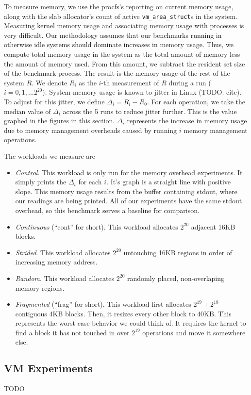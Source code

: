 \documentclass[twocolumn,11pt]{article}
\begin{document}
To measure memory, we use the procfs's reporting on current memory usage, along
with the slab allocator's count of active \texttt{vm\_area\_struct}s in the
system. Measuring kernel memory usage and associating memory usage with
processes is very difficult. Our methodology assumes that our benchmarks running
in otherwise idle systems should dominate increases in memory usage.  Thus, we
compute total memory usage in the system as the total amount of memory less the
amount of memory used. From this amount, we subtract the resident set size of
the benchmark process. The result is the memory usage of the rest of the system
$R$. We denote $R_i$ as the $i$-th measurement of $R$ during a run ($i = 0, 1,
... 2^{20}$). System memory usage is known to jitter in Linux (TODO: cite). To
adjust for this jitter, we define $\Delta_i = R_i - R_0$. For each operation, we
take the median value of $\Delta_i$ across the 5 runs to reduce jitter further.
This is the value graphed in the figures in this section. $\Delta_i$ represents
the increase in memory usage due to memory management overheads caused by
running $i$ memory management operations.

The workloads we measure are

\begin{itemize} \item \textit{Control}. This workload is only run for the memory
overhead experiments. It simply prints the $\Delta_i$ for each $i$. It's graph
is a straight line with positive slope. This memory usage results from the
buffer containing stdout, where our readings are being printed. All of our
experiments have the same stdout overhead, so this benchmark serves a baseline
for comparison.

\item \textit{Continuous} (``cont'' for short). This workload allocates $2^{20}$
adjacent 16KB blocks.

\item \textit{Strided}. This workload allocates $2^{20}$ untouching 16KB regions
in order of increasing memory address.

\item \textit{Random}. This workload allocates $2^{20}$ randomly placed,
non-overlaping memory regions.

\item \textit{Fragmented} (``frag'' for short). This workload first allocates
$2^{19} + 2^{18}$ contiguous 4KB blocks. Then, it resizes every other block to
40KB. This represents the worst case behavior we could think of. It requires the
kernel to find a block it has not touched in over $2^{19}$ operations and move
it somewhere else.  \end{itemize}

\subsection{VM Experiments}

TODO

{}

\end{document}
